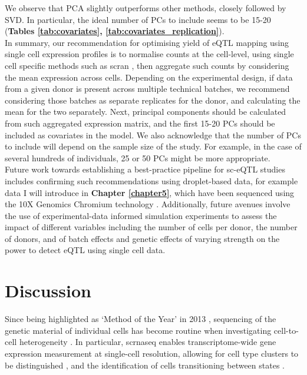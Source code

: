 We observe that PCA slightly outperforms other methods, closely followed by SVD.
In particular, the ideal number of PCs to include seems to be 15-20 (\textbf{Tables \ref{tab:covariates}, \ref{tab:covariates_replication}}). \\

In summary, our recommendation for optimising yield of eQTL mapping using single cell expression profiles is to normalise counts at the cell-level, using single cell specific methods such as scran \cite{lun2016step}, then aggregate such counts by considering the mean expression across cells.
Depending on the experimental design, if data from a given donor is present across multiple technical batches, we recommend considering those batches as separate replicates for the donor, and calculating the mean for the two separately.
Next, principal components should be calculated from such aggregated expression matrix, and the first 15-20 PCs should be included as covariates in the model.
We also acknowledge that the number of PCs to include will depend on the sample size of the study.
For example, in the case of several hundreds of individuals, 25 or 50 PCs might be more appropriate. \\

Future work towards establishing a best-practice pipeline for sc-eQTL studies includes confirming such recommendations using droplet-based data, for example data I will introduce in \textbf{Chapter 
\ref{chapter5}}, which have been sequenced using the 10X Genomics Chromium technology \cite{zheng2017massively}.
Additionally, future avenues involve the use of experimental-data informed simulation experiments to assess the impact of different variables including the number of cells per donor, the number of donors, and of batch effects and genetic effects of varying strength on the power to detect eQTL using single cell data.

\clearpage

\section{Discussion}

Since being highlighted as `Method of the Year' in 2013 \cite{editorial2014method}, sequencing of the genetic material of individual cells has become routine when investigating cell-to-cell heterogeneity \cite{lahnemann2020eleven}. 
In particular, 
\gls{scrnaseq}
enables transcriptome-wide gene expression measurement at single-cell resolution, allowing for cell type clusters to be distinguished \cite{anchang2016visualization, young2018single, muraro2016single, ernst2019staged, pijuan2019single, velten2017human},
and the identification of cells transitioning between states \cite{la2018rna, buettner2015computational, trapnell2014dynamics, bendall2014single, moignard2015decoding}. \\


